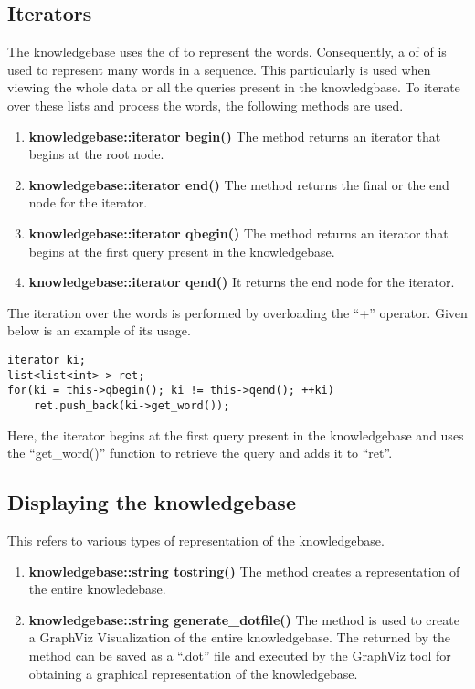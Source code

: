 \subsection*{Iterators}

The knowledgebase uses the \lists of \integer to represent the words. Consequently, a \lists of \lists of \integer is used to represent many words in a sequence. This particularly is used when viewing the whole data or all the queries present in the knowledgbase. To iterate over these lists and process the words, the following methods are used. 

\begin{enumerate}
\item \textbf{knowledgebase::iterator begin()} \vskip 1pt
	The method returns an iterator that begins at the root node.

\item \textbf{knowledgebase::iterator end()} \vskip 1pt
	The method returns the final or the end node for the iterator.
	 
\item \textbf{knowledgebase::iterator qbegin()} \vskip 1pt
	The method returns an iterator that begins at the first query present in the knowledgebase.
	
\item \textbf{knowledgebase::iterator qend()} \vskip 1pt
	It returns the end node for the iterator.
\end{enumerate}

The iteration over the words is performed by overloading the ``+'' operator. Given below is an example of its usage.
\begin{lstlisting}
iterator ki;
list<list<int> > ret;
for(ki = this->qbegin(); ki != this->qend(); ++ki)
	ret.push_back(ki->get_word());
\end{lstlisting}
Here, the iterator begins at the first query present in the knowledgebase and uses the ``get\_word()'' function to retrieve the query and adds it to ``ret''.

\subsection*{Displaying the knowledgebase}
This refers to various types of representation of the knowledgebase.

\begin{enumerate}

\item \textbf{knowledgebase::string tostring()} \vskip 1pt
The method creates a \stringtype representation of the entire knowledebase.

\item \textbf{knowledgebase::string generate\_dotfile()} \vskip 1pt
The method is used to create a GraphViz Visualization of the entire knowledgebase. The \stringtype returned by the method can be saved as a ``.dot'' file and executed by the GraphViz tool for obtaining a graphical representation of the knowledgebase. 

\end {enumerate}

